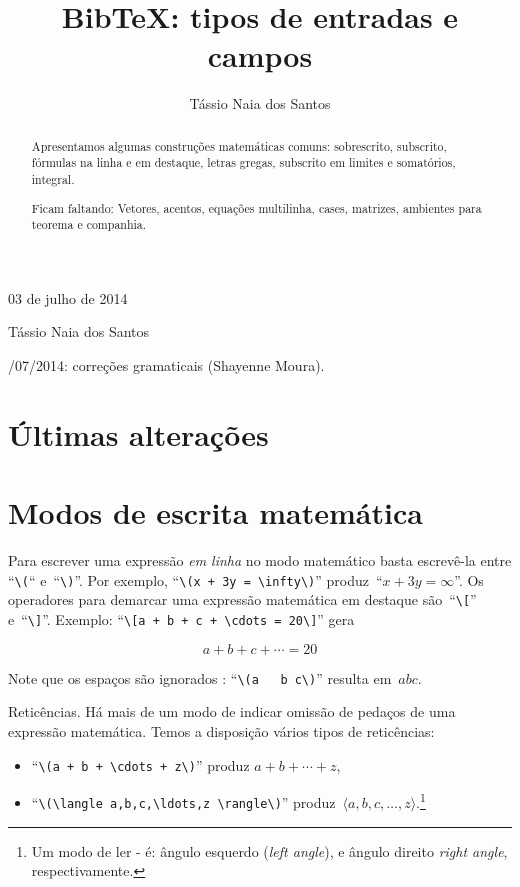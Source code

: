 \documentclass[article,openany]{memoir}
\title{Bib\TeX: tipos de entradas e campos}
\author{Tássio Naia dos Santos}
\begin{document}



\hfill 03 de julho de 2014

\medskip

\noindent Tássio Naia dos Santos

\medskip

/07/2014: correções gramaticais (Shayenne Moura).

\bigskip

\begin{abstract}
Apresentamos algumas construções matemáticas comuns: sobrescrito,
subscrito, fórmulas na linha e em destaque, letras gregas, subscrito
em limites e somatórios, integral. 

Ficam faltando: Vetores, acentos, equações multilinha, cases,
matrizes, ambientes para teorema e companhia.
\end{abstract}

\chapter{Últimas alterações}
\chapter{Modos de escrita matemática}

Para escrever uma expressão \emph{em linha} no modo matemático basta
escrevê-la entre ``\verb/\(/`` e~``\verb/\)/''. Por exemplo,
``\verb/\(x + 3y = \infty\)/'' produz~``\(x + 3y = \infty\)''. Os operadores para
demarcar uma expressão matemática em destaque são~``\verb/\[/''
e~``\verb/\]/''. Exemplo: ``\verb/\[a + b + c + \cdots = 20\]/'' gera

\[a+b+c+\cdots = 20\]

Note que os espaços são ignorados : ``\verb/\(a   b c\)/''
resulta em~\(a   b c\).

Reticências. Há mais de um modo de indicar omissão de pedaços de uma
expressão matemática. Temos a disposição vários tipos de reticências:
\begin{itemize}
\item ``\verb/\(a + b + \cdots + z\)/'' produz \(a+b+\cdots+z\), 
\item ``\verb/\(\langle a,b,c,\ldots,z \rangle\)/'' produz~\(\langle
  a,b,c,\ldots,z\rangle\).\footnote{Um modo de ler
    - é: ângulo esquerdo (\emph{left angle}), e
    ângulo direito \emph{right angle}, respectivamente.}
\end{itemize}
\end{document}
